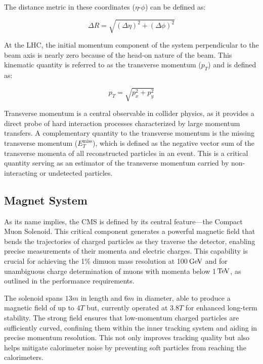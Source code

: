 The distance metric in these coordinates ($\eta$-$\phi$) can be defined as:

\begin{equation}
    \Delta R = \sqrt{(\Delta\eta)^2 + (\Delta \phi)^2}
\end{equation}

At the LHC, the initial momentum component of the system perpendicular to the beam axis is nearly zero because of the head-on nature of the beam. This kinematic quantity is referred to as the transverse momentum ($p_T$) and is defined as:

\begin{equation}
    p_T = \sqrt{p_x^2 + p_y^2}
\end{equation}

Transverse momentum is a central observable in collider physics, as it provides a direct probe of hard interaction processes characterized by large momentum transfers. A complementary quantity to the transverse momentum is the missing transverse momentum ($E_T^{\text{miss}}$), which is defined as the negative vector sum of the transverse momenta of all reconstructed particles in an event. This is a critical quantity serving as an estimator of the transverse momentum carried by non-interacting or undetected particles.

\subsection{Magnet System}

As its name implies, the CMS is defined by its central feature—the Compact Muon Solenoid. This critical component generates a powerful magnetic field that bends the trajectories of charged particles as they traverse the detector, enabling precise measurements of their momenta and electric charges. This capability is crucial for achieving the 1\% dimuon mass resolution at 100$\,\text{Ge\hspace{-.08em}V}$ and for unambiguous charge determination of muons with momenta below 1$\,\text{Te\hspace{-.08em}V}$, as outlined in the performance requirements.

The solenoid spans $13\unit{m}$ in length and $6\unit{m}$ in diameter, able to produce a magnetic field of up to $4\unit{T}$ but, currently operated at $3.8\unit{T}$ for enhanced long-term stability. The strong field ensures that low-momentum charged particles are sufficiently curved, confining them within the inner tracking system and aiding in precise momentum resolution. This not only improves tracking quality but also helps mitigate calorimeter noise by preventing soft particles from reaching the calorimeters.

